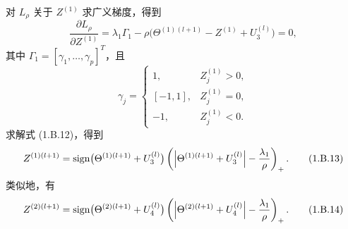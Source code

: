 对 $L_\rho$ 关于 $Z^{(1)}$ 求广义梯度，得到
\begin{equation}
\frac{\partial L_\rho}{\partial Z^{(1)}}
=\lambda_1\Gamma_1-\rho\bigl(\Theta^{(1)(l+1)}-Z^{(1)}+U_3^{(l)}\bigr)=0,
\tag{1.B.12}
\end{equation}
其中 $\Gamma_1=[\gamma_1,\ldots,\gamma_p]^T$，且
\[
\gamma_j=\begin{cases}
1,&Z_j^{(1)}>0,\\
[-1,1],&Z_j^{(1)}=0,\\
-1,&Z_j^{(1)}<0.
\end{cases}
\]
求解式 (1.B.12)，得到
\begin{equation}
Z^{(1)(l+1)}
=\operatorname{sign}\bigl(\Theta^{(1)(l+1)}+U_3^{(l)}\bigr)
\left(\left|\Theta^{(1)(l+1)}+U_3^{(l)}\right|-\frac{\lambda_1}{\rho}\right)_+.
\tag{1.B.13}
\end{equation}
类似地，有
\begin{equation}
Z^{(2)(l+1)}
=\operatorname{sign}\bigl(\Theta^{(2)(l+1)}+U_4^{(l)}\bigr)
\left(\left|\Theta^{(2)(l+1)}+U_4^{(l)}\right|-\frac{\lambda_1}{\rho}\right)_+.
\tag{1.B.14}
\end{equation}

